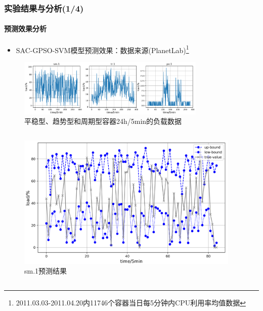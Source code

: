 \begin{frame}
\frametitle{实验结果与分析(1/4)}
\framesubtitle{预测效果分析}
\begin{itemize}
    \item SAC-GPSO-SVM模型预测效果：数据来源(PlanetLab)\footnote{\tiny{2011.03.03-2011.04.20内11746个容器当日每5分钟内CPU利用率均值数据}}
\end{itemize}
\begin{minipage}{\textwidth}
    \centering
    \begin{figure}[htb]
    \centering
    \includegraphics[width=0.8\textwidth]{figures/fig10_data_of_sm_tr_pe.png}
    \caption{平稳型、趋势型和周期型容器24h/5min的负载数据}
    \label{fig:fig10}
    \end{figure}
\end{minipage}
\begin{columns}[T,onlytextwidth]
\begin{column}{0.3\textwidth}
    \begin{minipage}{\textwidth}
        \begin{figure}
        \centering
        \includegraphics[width=\textwidth]{figures/fig11_a_sm_predict.png}
        \caption{sm.1预测结果}
        \label{fig:fig11_a}
        \end{figure}
    \end{minipage}
\end{column}
\begin{column}{0.3\textwidth}

\end{column}
\end{columns}
\end{frame}

